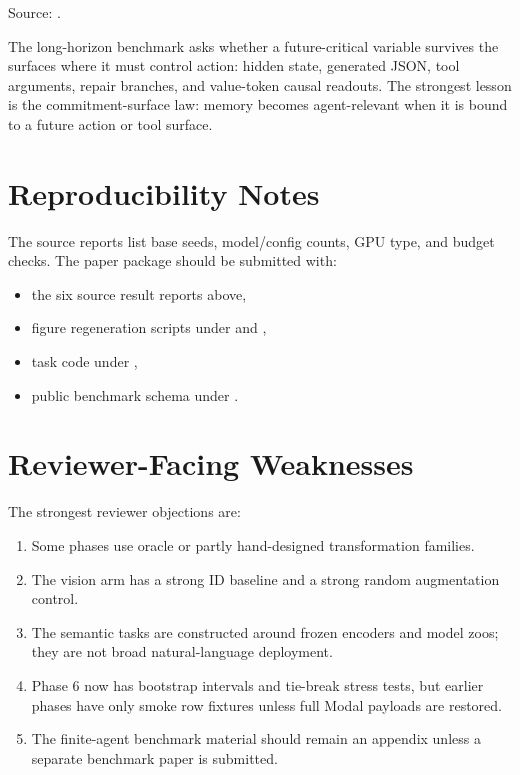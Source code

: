 Source: .

The long-horizon benchmark asks whether a future-critical variable survives the
surfaces where it must control action: hidden state, generated JSON, tool
arguments, repair branches, and value-token causal readouts. The strongest
lesson is the commitment-surface law: memory becomes agent-relevant when it is
bound to a future action or tool surface.

\section{Reproducibility Notes}

The source reports list base seeds, model/config counts, GPU type, and budget
checks. The paper package should be submitted with:
\begin{itemize}
  \item the six source result reports above,
  \item figure regeneration scripts under
   and
  ,
  \item task code under
  ,
  \item public benchmark schema under
  .
\end{itemize}

\section{Reviewer-Facing Weaknesses}

The strongest reviewer objections are:
\begin{enumerate}
  \item Some phases use oracle or partly hand-designed transformation families.
  \item The vision arm has a strong ID baseline and a strong random
  augmentation control.
  \item The semantic tasks are constructed around frozen encoders and model
  zoos; they are not broad natural-language deployment.
  \item Phase 6 now has bootstrap intervals and tie-break stress tests, but
  earlier phases have only smoke row fixtures unless full Modal payloads are
  restored.
  \item The finite-agent benchmark material should remain an appendix unless a
  separate benchmark paper is submitted.
\end{enumerate}

